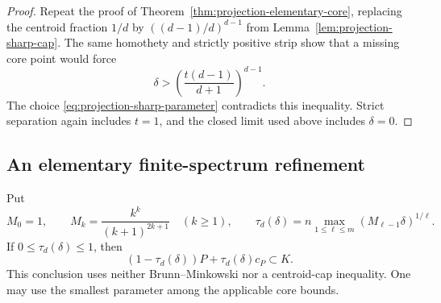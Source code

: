 \begin{proof}
Repeat the proof of Theorem~\ref{thm:projection-elementary-core},
replacing the centroid fraction $1/d$ by
$((d-1)/d)^{d-1}$ from Lemma~\ref{lem:projection-sharp-cap}.
The same homothety and strictly positive strip show that a missing
core point would force
\[
 \delta>
 \left(\frac{t(d-1)}{d+1}\right)^{d-1}.
\]
The choice \eqref{eq:projection-sharp-parameter} contradicts this
inequality.  Strict separation again includes $t=1$, and the closed
limit used above includes $\delta=0$.
\end{proof}

\subsection{An elementary finite-spectrum refinement}

\begin{theorem}
\label{thm:projection-finite-spectrum}
Put
\[
 M_0=1,\qquad M_k=\frac{k^k}{(k+1)^{2k+1}}\quad(k\geq1),
 \qquad
 \tau_d(\delta)=n\max_{1\leq\ell\leq m}
                   (M_{\ell-1}\delta)^{1/\ell}.
\]
If $0\leq\tau_d(\delta)\leq1$, then
\begin{equation}
 (1-\tau_d(\delta))P+\tau_d(\delta)c_P\subset K.
 \label{eq:projection-finite-spectrum-core}
\end{equation}
This conclusion uses neither Brunn--Minkowski nor a centroid-cap
inequality.  One may use the smallest parameter among the applicable
core bounds.
\end{theorem}

